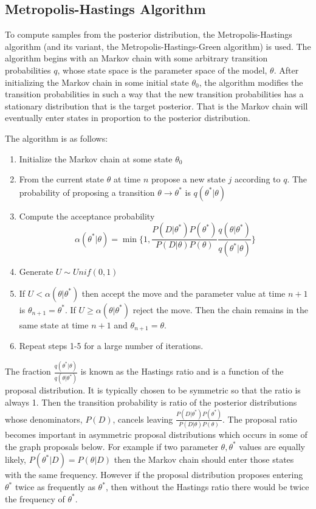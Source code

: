 \documentclass[]{article}
\numberwithin{equation}{section}
\begin{document}
\hypertarget{metropolis-hastings-algorithm}{%
\subsection{Metropolis-Hastings
Algorithm}\label{metropolis-hastings-algorithm}}

To compute samples from the posterior distribution, the
Metropolis-Hastings algorithm (and its variant, the
Metropolis-Hastings-Green algorithm) is used. The algorithm begins with
an Markov chain with some arbitrary transition probabilities \(q\),
whose state space is the parameter space of the model, \(\theta\). After
initializing the Markov chain in some initial state \(\theta_0\), the
algorithm modifies the transition probabilities in such a way that the
new transition probabilities has a stationary distribution that is the
target posterior. That is the Markov chain will eventually enter states
in proportion to the posterior distribution.

The algorithm is as follows:

\begin{enumerate}
\def\labelenumi{\arabic{enumi}.}
\item
  Initialize the Markov chain at some state \(\theta_0\)
\item
  From the current state \(\theta\) at time \(n\) propose a new state
  \(j\) according to \(q\). The probability of proposing a transition
  \(\theta \rightarrow \theta^*\) is \(q(\theta^*|\theta)\)
\item
  Compute the acceptance probability
  \[\alpha(\theta^*|\theta) = \min\{1, \frac{P(D|\theta^*)P(\theta^*)}{P(D|\theta)P(\theta)}\frac{q(\theta|\theta^*)}{q(\theta^*|\theta)} \}\]
\item
  Generate \(U \sim Unif(0,1)\)
\item
  If \(U < \alpha(\theta|\theta^*)\) then accept the move and the
  parameter value at time \(n+1\) is \(\theta_{n+1} = \theta^*\). If
  \(U \geq \alpha(\theta|\theta^*)\) reject the move. Then the chain
  remains in the same state at time \(n+1\) and
  \(\theta_{n+1} = \theta\).
\item
  Repeat steps 1-5 for a large number of iterations.
\end{enumerate}

The fraction \(\frac{q(\theta^*|\theta)}{q(\theta|\theta^*)}\) is known
as the Hastings ratio and is a function of the proposal distribution. It
is typically chosen to be symmetric so that the ratio is always 1. Then
the transition probability is ratio of the posterior distributions whose
denominators, \(P(D)\), cancels leaving
\(\frac{P(D|\theta^*)P(\theta^*)}{P(D|\theta)P(\theta)}\). The proposal
ratio becomes important in asymmetric proposal distributions which
occurs in some of the graph proposals below. For example if two
parameter \(\theta, \theta^*\) values are equally likely,
\(P(\theta^*|D) = P(\theta|D)\) then the Markov chain should enter those
states with the same frequency. However if the proposal distribution
proposes entering \(\theta^*\) twice as frequently as \(\theta^*\), then
without the Hastings ratio there would be twice the frequency of
\(\theta^*\).
\end{document}

